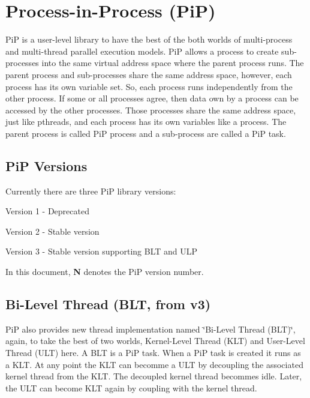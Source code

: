 \section*{Process-\/in-\/\-Process (Pi\-P)}

Pi\-P is a user-\/level library to have the best of the both worlds of multi-\/process and multi-\/thread parallel execution models. Pi\-P allows a process to create sub-\/processes into the same virtual address space where the parent process runs. The parent process and sub-\/processes share the same address space, however, each process has its own variable set. So, each process runs independently from the other process. If some or all processes agree, then data own by a process can be accessed by the other processes. Those processes share the same address space, just like pthreads, and each process has its own variables like a process. The parent process is called Pi\-P process and a sub-\/process are called a Pi\-P task.

\subsection*{Pi\-P Versions}

Currently there are three Pi\-P library versions\-:


\begin{DoxyItemize}
\item Version 1 -\/ Deprecated
\item Version 2 -\/ Stable version
\item Version 3 -\/ Stable version supporting B\-L\-T and U\-L\-P
\end{DoxyItemize}

In this document, {\bfseries N} denotes the Pi\-P version number.

\subsection*{Bi-\/\-Level Thread (B\-L\-T, from v3)}

Pi\-P also provides new thread implementation named \char`\"{}\-Bi-\/\-Level Thread
(\-B\-L\-T)\char`\"{}, again, to take the best of two worlds, Kernel-\/\-Level Thread (K\-L\-T) and User-\/\-Level Thread (U\-L\-T) here. A B\-L\-T is a Pi\-P task. When a Pi\-P task is created it runs as a K\-L\-T. At any point the K\-L\-T can becomme a U\-L\-T by decoupling the associated kernel thread from the K\-L\-T. The decoupled kernel thread becommes idle. Later, the U\-L\-T can become K\-L\-T again by coupling with the kernel thread.

